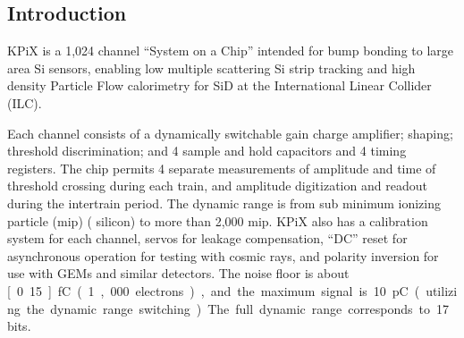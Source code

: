 
\subsection{Introduction}
KPiX is a 1,024 channel “System on a Chip” intended for bump bonding to large area Si sensors, enabling low multiple scattering Si strip tracking and high density Particle Flow calorimetry for SiD at the International Linear Collider (ILC).

Each channel consists of a dynamically switchable gain charge amplifier; shaping; threshold discrimination; and 4 sample and hold capacitors and 4 timing registers. The chip permits 4 separate measurements of amplitude and time of threshold crossing during each train, and amplitude digitization and readout during the intertrain period. The dynamic range is from sub minimum ionizing particle (mip) (\unit[320]{\micron} silicon) to more than 2,000 mip. KPiX also has a calibration system for each channel, servos for leakage compensation, “DC” reset for asynchronous operation for testing with cosmic rays, and polarity inversion for use with GEMs and similar detectors. The noise floor is about \unit[0.15]{fC} (~1,000 electrons), and the maximum signal is 10 pC (utilizing the dynamic range switching). The full dynamic range corresponds to 17 bits.

